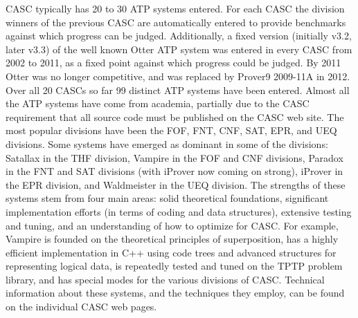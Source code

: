 \documentclass{easychair}
\begin{document}
CASC typically has 20 to 30 ATP systems entered.
For each CASC the division winners of the previous CASC are automatically
entered to provide benchmarks against which progress can be judged.
Additionally, a fixed version (initially v3.2, later v3.3) of the well known 
Otter ATP system was entered in every CASC from 2002 to 2011, as a fixed 
point against which progress could be judged.
By 2011 Otter was no longer competitive, and was replaced by Prover9 2009-11A
in 2012.
Over all 20 CASCs so far 99 distinct ATP systems have been entered.
Almost all the ATP systems have come from academia, partially due to the
CASC requirement that all source code must be published on the CASC web site.
The most popular divisions have been the FOF, FNT, CNF, SAT, EPR, and 
UEQ divisions.
Some systems have emerged as dominant in some of the divisions:
Satallax in the THF division, Vampire in the FOF and CNF divisions, Paradox
in the FNT and SAT divisions (with iProver now coming on strong), iProver
in the EPR division, and Waldmeister in the UEQ division.
The strengths of these systems stem from four main areas:
solid theoretical foundations, significant implementation efforts (in terms
of coding and data structures), extensive testing and tuning, and an
understanding of how to optimize for CASC.
For example, Vampire is founded on the theoretical principles of 
superposition, has a highly efficient implementation in C++ using code
trees and advanced structures for representing logical data, is repeatedly
tested and tuned on the TPTP problem library, and has special modes for
the various divisions of CASC.
Technical information about these systems, and the techniques they employ,
can be found on the individual CASC web pages.
\end{document}
